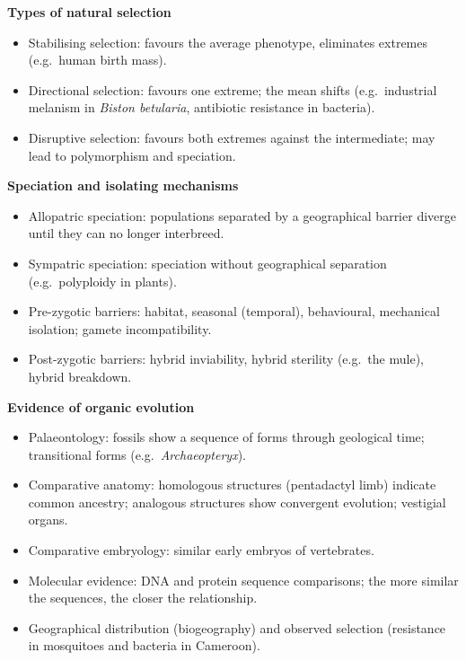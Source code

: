 \documentclass[11pt]{article}
\newcommand{\cle}[1]{{\popxbold\color{popdark}#1}}
\begin{document}
\begin{bilan}
\textbf{Types of natural selection}\par
\begin{itemize}
\item \cle{Stabilising selection}: favours the average phenotype, eliminates extremes (e.g.\ human birth mass).
\item \cle{Directional selection}: favours one extreme; the mean shifts (e.g.\ industrial melanism in \emph{Biston betularia}, antibiotic resistance in bacteria).
\item \cle{Disruptive selection}: favours both extremes against the intermediate; may lead to polymorphism and speciation.
\end{itemize}

\textbf{Speciation and isolating mechanisms}\par
\begin{itemize}
\item \cle{Allopatric speciation}: populations separated by a geographical barrier diverge until they can no longer interbreed.
\item \cle{Sympatric speciation}: speciation without geographical separation (e.g.\ polyploidy in plants).
\item \cle{Pre-zygotic barriers}: habitat, seasonal (temporal), behavioural, mechanical isolation; gamete incompatibility.
\item \cle{Post-zygotic barriers}: hybrid inviability, hybrid sterility (e.g.\ the mule), hybrid breakdown.
\end{itemize}

\textbf{Evidence of organic evolution}\par
\begin{itemize}
\item \cle{Palaeontology}: fossils show a sequence of forms through geological time; transitional forms (e.g.\ \emph{Archaeopteryx}).
\item \cle{Comparative anatomy}: homologous structures (pentadactyl limb) indicate common ancestry; analogous structures show convergent evolution; vestigial organs.
\item \cle{Comparative embryology}: similar early embryos of vertebrates.
\item \cle{Molecular evidence}: DNA and protein sequence comparisons; the more similar the sequences, the closer the relationship.
\item \cle{Geographical distribution} (biogeography) and observed selection (resistance in mosquitoes and bacteria in Cameroon).
\end{itemize}


\end{bilan}
\end{document}
